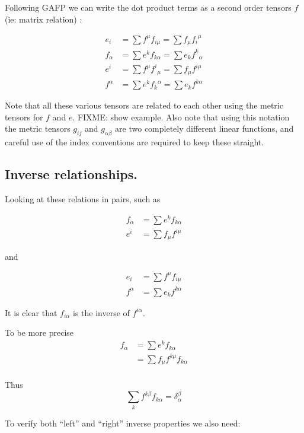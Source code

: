 Following GAFP we can write the dot product terms as a second order tensors $f$ (ie: matrix relation) :

\begin{align*}
e_i 		&= \sum f^{\mu} f_{i\mu}  	= \sum f_{\mu} {f_i}^{\mu} \\
f_{\alpha} 	&= \sum e^k f_{k\alpha} 	= \sum e_k {f^k}_{\alpha} \\
e^i 		&= \sum f^{\mu} {f^i}_{\mu} 	= \sum f_{\mu} f^{i \mu} \\
f^{\alpha} 	&= \sum e^k {f_k}^{\alpha}  	= \sum e_k f^{k\alpha}
\end{align*}

Note that all these various tensors are related to each other using the metric tensors for $f$ and $e$.  FIXME: show example.  Also note that using this notation the metric tensors $g_{ij}$ and $g_{\alpha\beta}$ are two completely different linear functions, and careful use of the index conventions are required to keep these straight.

\subsection{Inverse relationships. }

Looking at these relations in pairs, such as

\begin{align*}
f_{\alpha} 	&= \sum e^k f_{k\alpha} \\ 
e^i 		&= \sum f_{\mu} f^{i \mu} 
\end{align*}

and 

\begin{align*}
e_i 		&= \sum f^{\mu} f_{i\mu} \\
f^{\alpha} 	&= \sum e_k f^{k\alpha}
\end{align*}

It is clear that $f_{i\alpha}$ is the inverse of $f^{i\alpha}$.  

To be more precise 
\begin{align*}
f_{\alpha} 
&= \sum e^k f_{k\alpha} \\ 
&= \sum f_{\mu} f^{k \mu} f_{k\alpha} \\ 
\end{align*}

Thus
\begin{equation}
\sum_k f^{k \beta} f_{k\alpha} = \delta_{\alpha}^{\beta}
\end{equation}

To verify both ``left'' and ``right'' inverse properties we also need:

